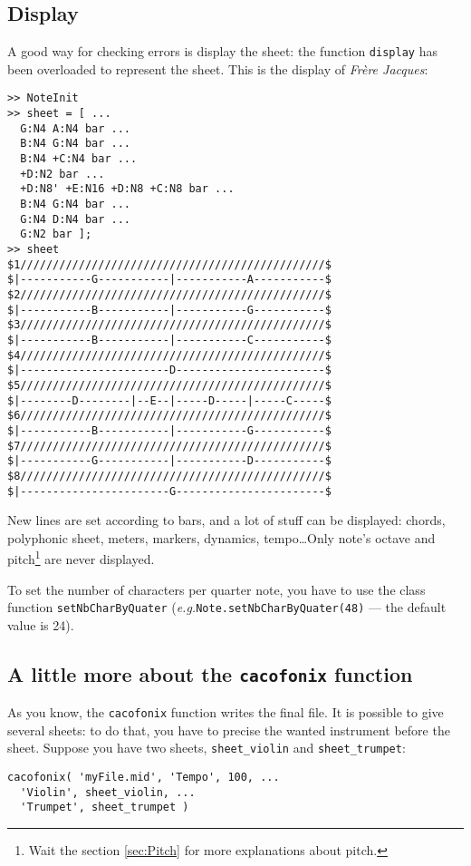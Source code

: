\documentclass{article}
\newcommand{\frerejaques}{\emph{Fr\`ere Jacques}\xspace}
\newcommand{\eg}{\emph{e.g.}\xspace}
\begin{document}
\subsection{Display}

A good way for checking errors is display the sheet: the function \lstinline!display! has been overloaded to represent the sheet. This is the display of \frerejaques:
\begin{lstlisting}
>> NoteInit
>> sheet = [ ...
  G:N4 A:N4 bar ...
  B:N4 G:N4 bar ...
  B:N4 +C:N4 bar ...
  +D:N2 bar ...
  +D:N8' +E:N16 +D:N8 +C:N8 bar ...
  B:N4 G:N4 bar ...
  G:N4 D:N4 bar ...
  G:N2 bar ];
>> sheet
$1///////////////////////////////////////////////$
$|-----------G-----------|-----------A-----------$
$2///////////////////////////////////////////////$
$|-----------B-----------|-----------G-----------$
$3///////////////////////////////////////////////$
$|-----------B-----------|-----------C-----------$
$4///////////////////////////////////////////////$
$|-----------------------D-----------------------$
$5///////////////////////////////////////////////$
$|--------D--------|--E--|-----D-----|-----C-----$
$6///////////////////////////////////////////////$
$|-----------B-----------|-----------G-----------$
$7///////////////////////////////////////////////$
$|-----------G-----------|-----------D-----------$
$8///////////////////////////////////////////////$
$|-----------------------G-----------------------$
\end{lstlisting}

New lines are set according to bars, and a lot of stuff can be displayed: chords, polyphonic sheet, meters, markers, dynamics, tempo\dots Only note's octave and pitch\footnote{Wait the section \ref{sec:Pitch} for more explanations about pitch.} are never displayed.

To set the number of characters per quarter note, you have to use the class function \lstinline!setNbCharByQuater! (\eg \lstinline!Note.setNbCharByQuater(48)! --- the default value is 24).

\subsection{A little more about the \lstinline!cacofonix! function}

As you know, the \lstinline!cacofonix! function writes the final file. It is possible to give several sheets: to do that, you have to precise the wanted instrument before the sheet. Suppose you have two sheets, \lstinline!sheet_violin! and \lstinline!sheet_trumpet!:
\begin{lstlisting}
cacofonix( 'myFile.mid', 'Tempo', 100, ...
  'Violin', sheet_violin, ...
  'Trumpet', sheet_trumpet )
\end{lstlisting}
\end{document}
